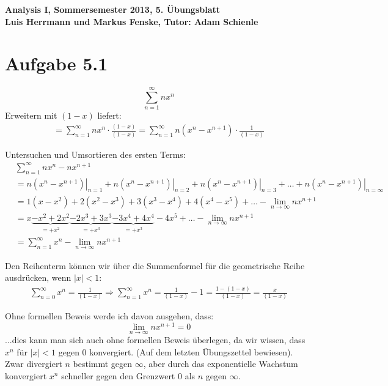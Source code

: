 \documentclass[a4paper,german,12pt,smallheadings]{scrartcl}
\begin{document}
\begin{center}
\bfseries %
\sffamily %
\vspace{-40pt}
Analysis I, Sommersemester 2013, 5. Übungsblatt \\
Luis Herrmann und Markus Fenske, Tutor: Adam Schienle
\vspace{-10pt}
\end{center}

\section*{Aufgabe 5.1}

\begin{equation*}
\sum_{n=1}^\infty nx^n 
\end{equation*}
Erweitern mit $(1-x)$ liefert:
\begin{align*}
  =\sum\limits_{n=1}^{\infty} nx^n \cdot \frac{(1-x)}{(1-x)}
  =\sum_{n=1}^\infty n(x^n - x^{n+1}) \cdot \frac{1}{(1-x)}
\end{align*}

Untersuchen und Umsortieren des ersten Terms:
\begin{align*}
  &\sum_{n=1}^\infty nx^n - nx^{n+1} \\
  &= \left. n(x^n - x^{n+1}) \right|_{n=1} + \left. n(x^n - x^{n+1}) \right|_{n=2} + \left. n(x^n - x^{n+1}) \right|_{n=3} + \dots + \left. n(x^n - x^{n+1}) \right|_{n=\infty}\\
  &= 1(x - x^2) + 2(x^2 - x^3) + 3(x^3 - x^4) + 4(x^4 - x^5) + \dots - \lim\limits_{n \to \infty} nx^{n+1}\\
  &= x \underbrace{- x^2 + 2x^2}_{=+x^2} \underbrace{- 2x^3 + 3x^3}_{=+x^3} \underbrace{- 3x^4 + 4x^4}_{=+x^3} - 4x^5 + \dots - \lim\limits_{n \to \infty} nx^{n+1}\\
  &= \sum_{n=1}^\infty x^n - \lim\limits_{n \to \infty} nx^{n+1}
\end{align*}

Den Reihenterm können wir über die Summenformel für die geometrische Reihe ausdrücken, wenn $|x| < 1$:
\begin{align*}
  \sum_{n=0}^\infty x^n = \frac{1}{(1-x)} \Rightarrow \sum_{n=1}^\infty x^n= \frac{1}{(1-x)} - 1 = \frac{1-\left(1-x\right)}{(1-x)}= \frac{x}{(1-x)}
\end{align*}

Ohne formellen Beweis werde ich davon ausgehen, dass:
\begin{equation*}
  \lim\limits_{n \to \infty} nx^{n+1}=0
\end{equation*}
...dies kann man sich auch ohne formellen Beweis überlegen, da wir wissen, dass $x^n$ für $|x|<1$ gegen 0 konvergiert. (Auf dem letzten Übungszettel bewiesen). Zwar divergiert $n$ bestimmt gegen $\infty$, aber durch das exponentielle Wachstum konvergiert $x^n$ schneller gegen den Grenzwert 0 als $n$ gegen $\infty$.
\end{document}
